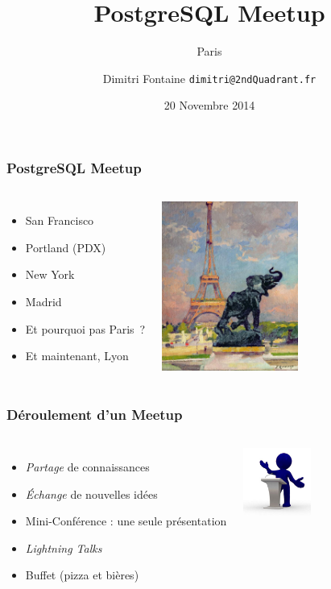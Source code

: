 \documentclass{beamer}
\title{PostgreSQL Meetup}
\subtitle{Paris}
\author{Dimitri Fontaine \texttt{dimitri@2ndQuadrant.fr}}
\date{20 Novembre 2014}
\begin{document}
\frame{\titlepage}

\begin{frame}[fragile]
  \frametitle{PostgreSQL Meetup}

  \vfill

\begin{columns}

  \begin{itemize}
  \item San Francisco
  \item Portland (PDX)
  \item New York
  \item Madrid
  \item Et pourquoi pas Paris ?
  \item Et maintenant, Lyon
  \end{itemize}

\begin{center}
  \includegraphics[height=15em]{the-eiffel-tower-and-the-elephant-by-fremiet-jules-ernest-renoux.jpg}
\end{center}
\end{columns}
\end{frame}

\begin{frame}[fragile]
  \frametitle{Déroulement d'un Meetup}

  \vfill

\begin{columns}

\begin{itemize}
\item \textit{Partage} de connaissances
\item \textit{Échange} de nouvelles idées
\item Mini-Conférence : une seule présentation
\item \textit{Lightning Talks}
\item Buffet (pizza et bières)
\end{itemize}

\begin{center}
  \includegraphics[height=6em]{conferences.jpg}
\end{center}
\end{columns}
\end{frame}
\end{document}
